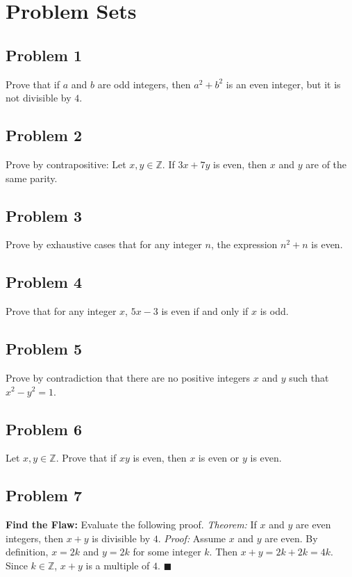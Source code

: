 \documentclass[11pt]{article}
\begin{document}
\newpage

\section{Problem Sets}

\subsection{Problem 1}
Prove that if $a$ and $b$ are odd integers, then $a^2 + b^2$ is an even integer, but it is not divisible by $4$.

\subsection{Problem 2}
Prove by contrapositive: Let $x, y \in \mathbb{Z}$. If $3x + 7y$ is even, then $x$ and $y$ are of the same parity.

\subsection{Problem 3}
Prove by exhaustive cases that for any integer $n$, the expression $n^2 + n$ is even.

\subsection{Problem 4}
Prove that for any integer $x$, $5x - 3$ is even if and only if $x$ is odd.

\subsection{Problem 5}
Prove by contradiction that there are no positive integers $x$ and $y$ such that $x^2 - y^2 = 1$.

\subsection{Problem 6}
Let $x, y \in \mathbb{Z}$. Prove that if $xy$ is even, then $x$ is even or $y$ is even.

\subsection{Problem 7}
\textbf{Find the Flaw:} Evaluate the following proof. 
\textit{Theorem:} If $x$ and $y$ are even integers, then $x+y$ is divisible by $4$.
\textit{Proof:} Assume $x$ and $y$ are even. By definition, $x = 2k$ and $y = 2k$ for some integer $k$. Then $x+y = 2k + 2k = 4k$. Since $k \in \mathbb{Z}$, $x+y$ is a multiple of $4$. $\blacksquare$
\end{document}
